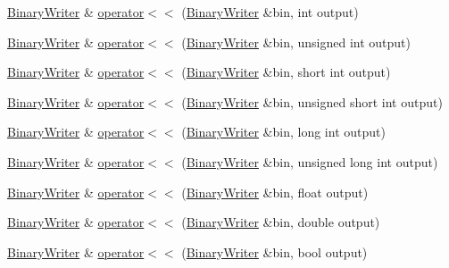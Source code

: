 \begin{DoxyCompactItemize}
\item 
\mbox{\hyperlink{classADATIO_1_1BinaryWriter}{Binary\+Writer}} \& \mbox{\hyperlink{namespaceADATIO_a07c89597706480c0ec7b346192b1f121}{operator$<$$<$}} (\mbox{\hyperlink{classADATIO_1_1BinaryWriter}{Binary\+Writer}} \&bin, int output)
\item 
\mbox{\hyperlink{classADATIO_1_1BinaryWriter}{Binary\+Writer}} \& \mbox{\hyperlink{namespaceADATIO_a9b4a06d24af68d2a6c22f575e0a0584a}{operator$<$$<$}} (\mbox{\hyperlink{classADATIO_1_1BinaryWriter}{Binary\+Writer}} \&bin, unsigned int output)
\item 
\mbox{\hyperlink{classADATIO_1_1BinaryWriter}{Binary\+Writer}} \& \mbox{\hyperlink{namespaceADATIO_acfdbfb8beb266b5c5f28a065b0a2e4b5}{operator$<$$<$}} (\mbox{\hyperlink{classADATIO_1_1BinaryWriter}{Binary\+Writer}} \&bin, short int output)
\item 
\mbox{\hyperlink{classADATIO_1_1BinaryWriter}{Binary\+Writer}} \& \mbox{\hyperlink{namespaceADATIO_aff2f4933a66b5468387c2361b16922ce}{operator$<$$<$}} (\mbox{\hyperlink{classADATIO_1_1BinaryWriter}{Binary\+Writer}} \&bin, unsigned short int output)
\item 
\mbox{\hyperlink{classADATIO_1_1BinaryWriter}{Binary\+Writer}} \& \mbox{\hyperlink{namespaceADATIO_a02e2a976b2de62419c11d0a1a112c31e}{operator$<$$<$}} (\mbox{\hyperlink{classADATIO_1_1BinaryWriter}{Binary\+Writer}} \&bin, long int output)
\item 
\mbox{\hyperlink{classADATIO_1_1BinaryWriter}{Binary\+Writer}} \& \mbox{\hyperlink{namespaceADATIO_a669b878c72c25b392c3068a6286e721e}{operator$<$$<$}} (\mbox{\hyperlink{classADATIO_1_1BinaryWriter}{Binary\+Writer}} \&bin, unsigned long int output)
\item 
\mbox{\hyperlink{classADATIO_1_1BinaryWriter}{Binary\+Writer}} \& \mbox{\hyperlink{namespaceADATIO_a9a1401ffe0590b7a54c2690d79073c22}{operator$<$$<$}} (\mbox{\hyperlink{classADATIO_1_1BinaryWriter}{Binary\+Writer}} \&bin, float output)
\item 
\mbox{\hyperlink{classADATIO_1_1BinaryWriter}{Binary\+Writer}} \& \mbox{\hyperlink{namespaceADATIO_a48a968b3177d5e46941cf9a358881c23}{operator$<$$<$}} (\mbox{\hyperlink{classADATIO_1_1BinaryWriter}{Binary\+Writer}} \&bin, double output)
\item 
\mbox{\hyperlink{classADATIO_1_1BinaryWriter}{Binary\+Writer}} \& \mbox{\hyperlink{namespaceADATIO_a3cf019d891bf2265bd3c530f1bdd46a0}{operator$<$$<$}} (\mbox{\hyperlink{classADATIO_1_1BinaryWriter}{Binary\+Writer}} \&bin, bool output)
\item 

\end{DoxyCompactItemize}
